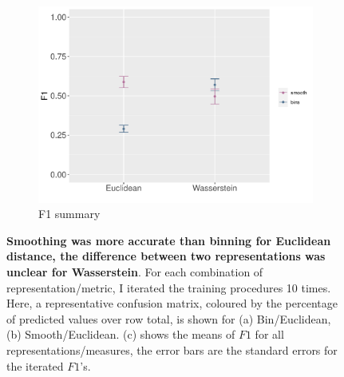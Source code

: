 \begin{figure}[htbp]
    \begin{subfigure}{0.5\textwidth}
    \centering
    \includegraphics[scale=0.8]{graphics/f1_gle.pdf}
    \caption{F1 summary}
    \label{fig:f1_gle}
    \end{subfigure}
    
    
    \caption{\textbf{Smoothing was more accurate than binning for Euclidean distance, the difference between two representations was unclear for Wasserstein}. For each combination of representation/metric, I iterated the training procedures 10 times. Here, a representative confusion matrix, coloured by the percentage of predicted values over row total, is shown for (a) Bin/Euclidean, (b) Smooth/Euclidean. (c) shows the means of $F1$ for all representations/measures, the error bars are the standard errors for the iterated $F1$'s.}
    \label{fig:ml_gle}
\end{figure}